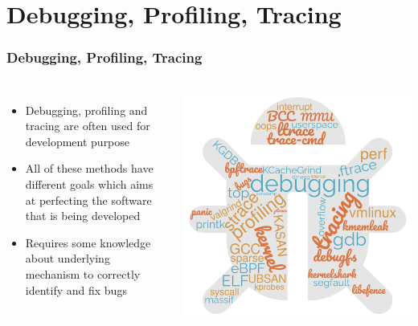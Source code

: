 \section{Debugging, Profiling, Tracing}

\begin{frame}
\frametitle{Debugging, Profiling, Tracing}
  \begin{columns}
    \begin{itemize}
      \item Debugging, profiling and tracing are often used for development purpose
      \item All of these methods have different goals which aims at perfecting the
            software that is being developed
      \item Requires some knowledge about underlying mechanism to correctly identify
            and fix bugs
    \end{itemize}
    \vspace{0.5cm}
    \includegraphics[height=0.6\textheight]{slides/debugging-principles/cloud_word.png}
  \end{columns}
\end{frame}


